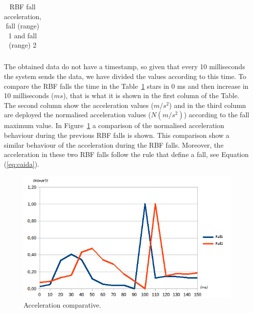 \documentclass[conference]{IEEEtran}
\theoremstyle{definition}
\begin{document}
\begin{table}[!h]
 \centering
 \begin{tabular}{*{5}{r}}
   
 \end{tabular}
 \caption{RBF fall acceleration, fall (range) 1 and fall (range) 2}%
 \label{tabla:RBF}
\end{table}

%       
%       

The obtained data do not have a timestamp, so given that every 10 milliseconds the system sends the data, we have
divided the values according to this time. To compare the RBF falls the time in the Table~\ref{tabla:RBF} 
stars in 0 ms and then increase in 10 milliseconds ($ms$), that is what it is shown in 
the first column of the Table. The second column show the acceleration values ($m/s^2$) and in the third column
are deployed the normalised acceleration values ($N(m/s^2)$) according to the fall maximum value. In 
Figure~\ref{fig:Sensor1} a comparison of the normalised acceleration behaviour during the previous RBF falls is shown. 
This comparison show a similar behaviour of the acceleration during the RBF falls.
Moreover, the acceleration in these two RBF falls follow the rule that define a fall, see Equation (\ref{eq:caida}).

\begin{figure}[!h]
  \centering
  \includegraphics[scale=0.5]{img/Comparativa}
  \caption[Acceleration comparative]{Acceleration comparative.}
  \label{fig:Sensor1}
\end{figure}
\end{document}

